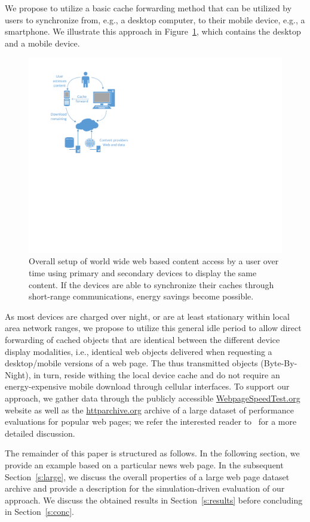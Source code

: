 \documentclass[letterpaper,conference]{IEEEtran}
\begin{document}
We propose to utilize a basic cache forwarding method that can be utilized by users to synchronize from, e.g., a desktop computer, to their mobile device, e.g., a smartphone.
We illustrate this approach in Figure~\ref{fig:setup}, which contains the desktop and a mobile device. 
\begin{figure}
	\centering
	\includegraphics[width=.9\linewidth]{Drawing1}
	\caption{Overall setup of world wide web based content access by a user over time using primary and secondary devices to display the same content. If the devices are able to synchronize their caches through short-range communications, energy savings become possible.}
	\label{fig:setup}
\end{figure}
As most devices are charged over night, or are at least stationary within local area network ranges, we propose to utilize this general idle period to allow direct forwarding of cached objects that are identical between the different device display modalities, i.e., identical web objects delivered when requesting a desktop/mobile versions of a web page.
The thus transmitted objects (Byte-By-Night), in turn, reside withing the local device cache and do not require an energy-expensive mobile download through cellular interfaces.
To support our approach, we gather data through the publicly accessible \url{WebpageSpeedTest.org} website as well as the \url{httparchive.org} archive of a large dataset of performance evaluations for popular web pages; we refer the interested reader to~\cite{Me13} for a more detailed discussion.

The remainder of this paper is structured as follows.
In the following section, %
we provide an example based on a particular news web page.
In the subsequent Section~\ref{s:large}, we discuss the overall properties of a large web page dataset archive and provide a description for the simulation-driven evaluation of our approach. We discuss the obtained results in Section~\ref{s:results} before concluding in Section~\ref{s:conc}.
\end{document}
